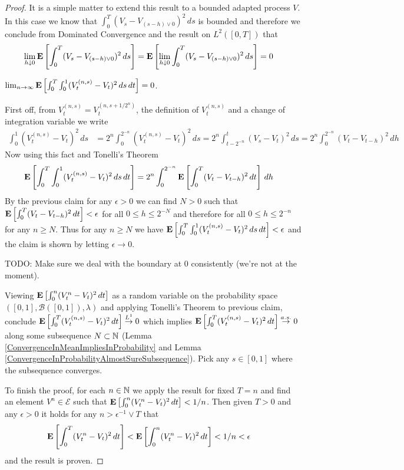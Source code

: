 \begin{proof}
It is a simple matter to extend this result to a bounded adapted process $V$.  In this case we know that $\int_0^T (V_s - V_{(s-h) \vee 0})^2 \, ds$ is bounded and therefore we conclude from Dominated Convergence and the result on $L^2([0,T])$ that
\begin{align*}
\lim_{h \downarrow 0} \textbf{E}\left[\int_0^T (V_s - V_{(s-h) \vee 0})^2 \, ds\right] &= \textbf{E}\left[\lim_{h \downarrow 0} \int_0^T (V_s - V_{(s-h) \vee 0})^2 \, ds\right] = 0
\end{align*}

\begin{clm}$\lim_{n \to \infty } \textbf{E}\left[\int_0^T \int_0^1 (V^{(n,s)}_t - V_t)^2 \, ds \, dt\right] = 0$.
\end{clm}

First off, from $V^{(n,s)}_t = V^{(n, s+1/2^n)}_t$, the definition of $V^{(n,s)}_t$ and a change of integration variable we write
\begin{align*}
\int_0^1 (V^{(n,s)}_t - V_t)^2 \, ds &= 2^n \int_0^{2^{-n}}  (V^{(n,s)}_t - V_t)^2 \, ds = 2^n \int_{t-2^{-n}}^t  (V_s - V_t)^2 \, ds = 2^n \int_0^{2^{-n}}  (V_t - V_{t - h})^2 \, dh
\end{align*}
Now using this fact and Tonelli's Theorem
\begin{align*}
\textbf{E}\left[\int_0^T \int_0^1 (V^{(n,s)}_t - V_t)^2 \, ds \, dt\right]  &= 2^n \int_0^{2^{-n}} \textbf{E}\left[\int_0^T (V_t - V_{t -h})^2 \, dt\right]  \, dh
\end{align*}
By the previous claim for any $\epsilon > 0$ we can find $N>0$ such that $\textbf{E}\left[\int_0^T (V_t - V_{t -h})^2 \, dt\right] < \epsilon$ for all $0 \leq h \leq 2^{-N}$ and therefore for all $0 \leq h \leq 2^{-n}$ for any $n \geq N$.  Thus for any $n \geq N$ we have $\textbf{E}\left[\int_0^T \int_0^1 (V^{(n,s)}_t - V_t)^2 \, ds \, dt\right] < \epsilon$ and the claim is shown by letting $\epsilon \to 0$.

TODO: Make sure we deal with the boundary at $0$ consistently (we're not at the moment).

Viewing $\textbf{E}\left[\int_0^n (V^{n}_t - V_t)^2 \, dt\right]$ as a random variable on the probability space $([0,1], \mathcal{B}([0,1]), \lambda)$  and applying Tonelli's Theorem to previous claim, conclude $\textbf{E}\left[\int_0^T (V^{(n,s)}_t - V_t)^2 \, dt\right] \overset{L^1}\to 0$ which implies $\textbf{E}\left[\int_0^T (V^{(n,s)}_t - V_t)^2 \, dt\right] \overset{a.s.}\to 0$ along some subsequence $N \subset \mathbb{N}$ (Lemma \ref{ConvergenceInMeanImpliesInProbability}  and Lemma \ref{ConvergenceInProbabilityAlmostSureSubsequence}).  Pick any $s \in [0,1]$ where the subsequence converges.

To finish the proof, for each $n \in \mathbb{N}$ we apply the result for fixed $T=n$ and find an element $V^n \in \mathcal{E}$ such that $\textbf{E}\left[\int_0^n (V^{n}_t - V_t)^2 \, dt\right] < 1/n$.  Then given $T > 0$ and any $\epsilon > 0$ it holds for any $n > \epsilon^{-1} \vee T$ that 
\begin{align*}
\textbf{E}\left[\int_0^T (V^{n}_t - V_t)^2 \, dt\right] &< \textbf{E}\left[\int_0^n (V^{n}_t - V_t)^2 \, dt\right] < 1/n < \epsilon
\end{align*}
and the result is proven.
\end{proof}

